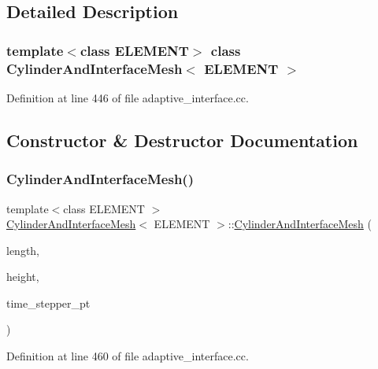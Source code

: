 \subsection{Detailed Description}
\subsubsection*{template$<$class E\+L\+E\+M\+E\+NT$>$\newline
class Cylinder\+And\+Interface\+Mesh$<$ E\+L\+E\+M\+E\+N\+T $>$}



Definition at line 446 of file adaptive\+\_\+interface.\+cc.



\subsection{Constructor \& Destructor Documentation}
\mbox{\label{classCylinderAndInterfaceMesh_ab62eda41cc4a5516017b2662bcba8d17}} 
\subsubsection{\texorpdfstring{Cylinder\+And\+Interface\+Mesh()}{CylinderAndInterfaceMesh()}}
{\footnotesize\ttfamily template$<$class E\+L\+E\+M\+E\+NT $>$ \\
\hyperlink{classCylinderAndInterfaceMesh}{Cylinder\+And\+Interface\+Mesh}$<$ E\+L\+E\+M\+E\+NT $>$\+::\hyperlink{classCylinderAndInterfaceMesh}{Cylinder\+And\+Interface\+Mesh} (\begin{DoxyParamCaption}\item[{const double \&}]{length,  }\item[{const double \&}]{height,  }\item[{Time\+Stepper $\ast$}]{time\+\_\+stepper\+\_\+pt }\end{DoxyParamCaption})\hspace{0.3cm}{\ttfamily [inline]}}



Definition at line 460 of file adaptive\+\_\+interface.\+cc.



